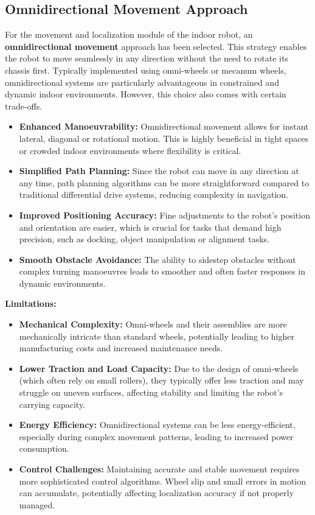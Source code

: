 \subsection{Omnidirectional Movement Approach}

For the movement and localization module of the indoor robot, an \textbf{omnidirectional movement} approach has been selected. This strategy enables the robot to move seamlessly in any direction without the need to rotate its chassis first. Typically implemented using omni-wheels or mecanum wheels, omnidirectional systems are particularly advantageous in constrained and dynamic indoor environments. However, this choice also comes with certain trade-offs.

\begin{itemize}
    \item \textbf{Enhanced Manoeuvrability:} Omnidirectional movement allows for instant lateral, diagonal or rotational motion. This is highly beneficial in tight spaces or crowded indoor environments where flexibility is critical.
    \item \textbf{Simplified Path Planning:} Since the robot can move in any direction at any time, path planning algorithms can be more straightforward compared to traditional differential drive systems, reducing complexity in navigation.
    \item \textbf{Improved Positioning Accuracy:} Fine adjustments to the robot's position and orientation are easier, which is crucial for tasks that demand high precision, such as docking, object manipulation or alignment tasks.
    \item \textbf{Smooth Obstacle Avoidance:} The ability to sidestep obstacles without complex turning manoeuvres leads to smoother and often faster responses in dynamic environments.
\end{itemize}

\textbf{Limitations:}
\begin{itemize}
    \item \textbf{Mechanical Complexity:} Omni-wheels and their assemblies are more mechanically intricate than standard wheels, potentially leading to higher manufacturing costs and increased maintenance needs.
    \item \textbf{Lower Traction and Load Capacity:} Due to the design of omni-wheels (which often rely on small rollers), they typically offer less traction and may struggle on uneven surfaces, affecting stability and limiting the robot's carrying capacity.
    \item \textbf{Energy Efficiency:} Omnidirectional systems can be less energy-efficient, especially during complex movement patterns, leading to increased power consumption.
    \item \textbf{Control Challenges:} Maintaining accurate and stable movement requires more sophisticated control algorithms. Wheel slip and small errors in motion can accumulate, potentially affecting localization accuracy if not properly managed.
\end{itemize}

